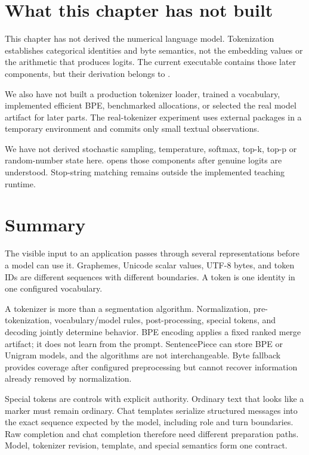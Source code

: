 \section{What this chapter has not
built}\label{what-this-chapter-has-not-built}

This chapter has not derived the numerical language model. Tokenization
establishes categorical identities and byte semantics, not the embedding
values or the arithmetic that produces logits. The current executable
contains those later components, but their derivation belongs to .

We also have not built a production tokenizer loader, trained a
vocabulary, implemented efficient BPE, benchmarked allocations, or
selected the real model artifact for later parts. The real-tokenizer
experiment uses external packages in a temporary environment and commits
only small textual observations.

We have not derived stochastic sampling, temperature, softmax, top-k, top-p
or random-number state here.  opens those components after genuine
logits are understood. Stop-string matching remains outside the implemented
teaching runtime.

\section{Summary}\label{summary-1}

The visible input to an application passes through several
representations before a model can use it. Graphemes, Unicode scalar
values, UTF-8 bytes, and token IDs are different sequences with
different boundaries. A token is one identity in one configured
vocabulary.

A tokenizer is more than a segmentation algorithm. Normalization,
pre-tokenization, vocabulary/model rules, post-processing, special
tokens, and decoding jointly determine behavior. BPE encoding applies a
fixed ranked merge artifact; it does not learn from the prompt.
SentencePiece can store BPE or Unigram models, and the algorithms are
not interchangeable. Byte fallback provides coverage after configured
preprocessing but cannot recover information already removed by
normalization.

Special tokens are controls with explicit authority. Ordinary text that
looks like a marker must remain ordinary. Chat templates serialize
structured messages into the exact sequence expected by the model,
including role and turn boundaries. Raw completion and chat completion
therefore need different preparation paths. Model, tokenizer revision,
template, and special semantics form one contract.

